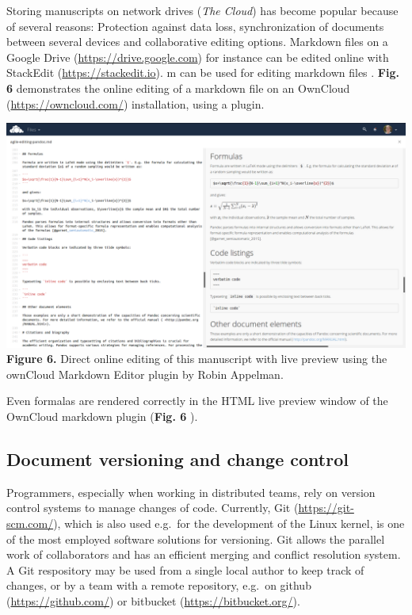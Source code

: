 \documentclass[10pt,fleqn]{wlpeerj}
\begin{document}
Storing
manuscripts
on
network
drives
(\emph{The
Cloud})
has
become
popular
because
of
several
reasons:
Protection
against
data
loss,
synchronization
of
documents
between
several
devices
and
collaborative
editing
options.
Markdown
files
on a
Google
Drive
(\url{https://drive.google.com})
for
instance
can
be
edited
online
with
StackEdit
(\url{https://stackedit.io}).
m can
be
used
for
editing
markdown
files
.
\textbf{Fig.
6}
demonstrates
the
online
editing
of a
markdown
file
on an
OwnCloud
(\url{https://owncloud.com/})
installation,
using
a
plugin.

\includegraphics{fig-owncloud-md-editor.png}
\textbf{Figure
6.}
Direct
online
editing
of
this
manuscript
with
live
preview
using
the
ownCloud
Markdown
Editor
plugin
by
Robin
Appelman.

Even
formalas
are
rendered
correctly
in
the
HTML
live
preview
window
of
the
OwnCloud
markdown
plugin
(\textbf{Fig.
6} ).

\subsection{Document
versioning
and
change
control}\label{document-versioning-and-change-control}

Programmers,
especially
when
working
in
distributed
teams,
rely
on
version
control
systems
to
manage
changes
of
code.
Currently,
Git
(\url{https://git-scm.com/}),
which
is
also
used
e.g.~for
the
development
of
the
Linux
kernel,
is
one
of
the
most
employed
software
solutions
for
versioning.
Git
allows
the
parallel
work
of
collaborators
and
has
an
efficient
merging
and
conflict
resolution
system.
A Git
respository
may
be
used
from
a
single
local
author
to
keep
track
of
changes,
or by
a
team
with
a
remote
repository,
e.g.~on
github
(\url{https://github.com/})
or
bitbucket
(\url{https://bitbucket.org/}).
\end{document}
